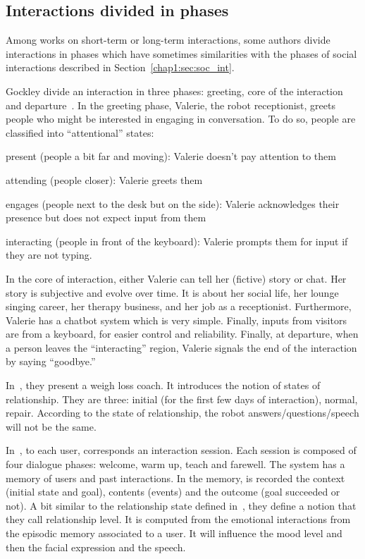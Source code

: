 \documentclass[a4paper,11pt,twoside]{StyleThese}
\begin{document}
\subsection{Interactions divided in phases}
Among works on short-term or long-term interactions, some authors divide interactions in phases which have sometimes similarities with the phases of social interactions described in Section~\ref{chap1:sec:soc_int}.

Gockley \etal{} divide an interaction in three phases: greeting, core of the interaction and departure~\cite{gockley_2005_designing}. In the greeting phase, Valerie, the robot receptionist, greets people who might be interested in engaging in conversation. To do so, people are classified into ``attentional'' states:
\begin{enumerate*}
	\item present (people a bit far and moving): Valerie doesn’t pay attention to them
	\item attending (people closer): Valerie greets them
	\item engages (people next to the desk but on the side): Valerie acknowledges their presence but does not expect input from them
	\item interacting (people in front of the keyboard): Valerie prompts them for input if they are not typing.
\end{enumerate*}
In the core of interaction, either Valerie can tell her (fictive) story or chat. Her story is subjective and evolve over time. It is about her social life, her lounge singing career, her therapy business, and her job as a receptionist. Furthermore, Valerie has a chatbot system which is very simple. Finally, inputs from visitors are from a keyboard, for easier control and reliability. Finally, at departure, when a person leaves the ``interacting'' region, Valerie signals the end of the interaction by saying ``goodbye.'' 

In~\cite{kidd_2008_robots}, they present a weigh loss coach. It introduces the notion of states of relationship. They are three: initial (for the first few days of interaction), normal, repair. According to the state of relationship, the robot answers/questions/speech will not be the same.

In~\cite{kasap_2012_building}, to each user, corresponds an interaction session. Each session is composed of four dialogue phases: welcome, warm up, teach and farewell. The system has a memory of users and past interactions. In the memory, is recorded the context (initial state and goal), contents (events) and the outcome (goal succeeded or not).  A bit similar to the relationship state defined in~\cite{kidd_2008_robots}, they define a notion that they call relationship level. It is computed from the emotional interactions from the episodic memory associated to a user. It will influence the mood level and then the facial expression and the speech.
\end{document}
